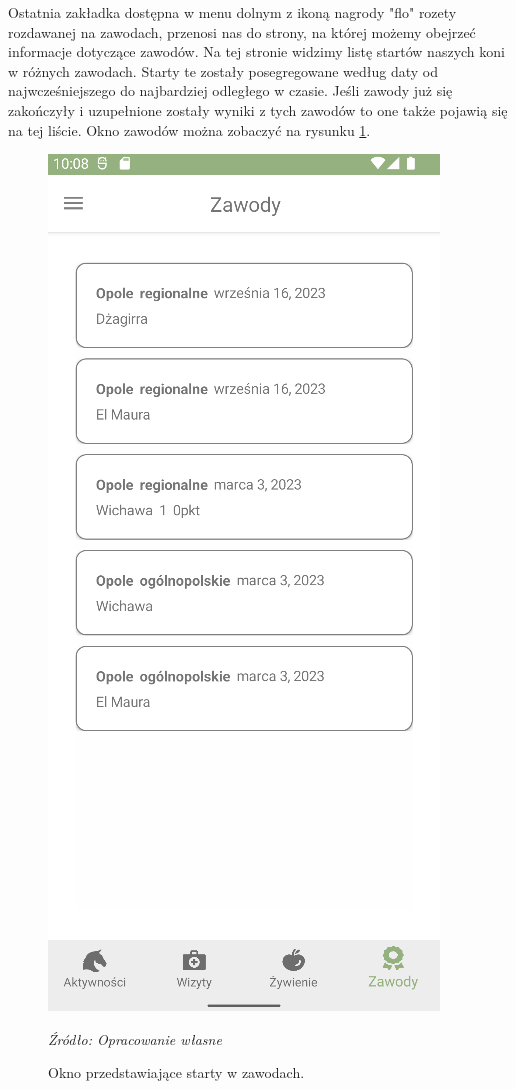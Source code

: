 \documentclass[12pt,oneside]{report}
\begin{document}
Ostatnia zakładka dostępna w menu dolnym z ikoną nagrody "flo" rozety rozdawanej na zawodach, przenosi nas do strony, na której możemy obejrzeć informacje dotyczące zawodów. Na tej stronie widzimy listę startów naszych koni w różnych zawodach. Starty te zostały posegregowane według daty od najwcześniejszego do najbardziej odległego w czasie. Jeśli zawody już się zakończyły i uzupełnione zostały wyniki z tych zawodów to one także pojawią się na tej liście. Okno zawodów można zobaczyć na rysunku \ref{Competition}.
\begin{figure}[H]
	\centering
	\includegraphics[scale=0.7]{CompetitionView}
	\caption{\centering Okno przedstawiające starty w zawodach.}
	\textit{Źródło: Opracowanie własne}
	\label{Competition}
\end{figure}
\end{document}
